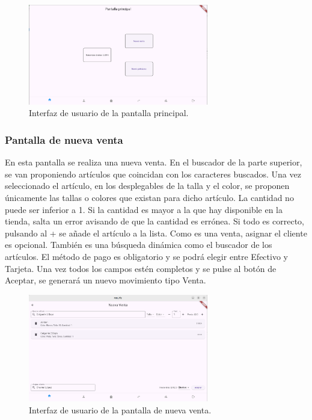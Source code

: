 \begin{figure}[H]
	\centering
	\includegraphics[width=0.7\textwidth]{imagenes/SegundaIteracion/pantallaPrincipal.png}
	\caption{Interfaz de usuario de la pantalla principal.}
	\label{fig:appPantallaPrincipal}
\end{figure}

\subsubsection{Pantalla de nueva venta}

En esta pantalla se realiza una nueva venta. En el buscador de la parte superior, se van proponiendo artículos que coincidan con los caracteres buscados. Una vez seleccionado el artículo, en los desplegables de la talla y el color, se proponen únicamente las tallas o colores que existan para dicho artículo. La cantidad no puede ser inferior a 1. Si la cantidad es mayor a la que hay disponible en la tienda, salta un error avisando de que la cantidad es errónea. Si todo es correcto, pulsando al + se añade el artículo a la lista. Como es una venta, asignar el cliente es opcional. También es una búsqueda dinámica como el buscador de los artículos. El método de pago es obligatorio y se podrá elegir entre Efectivo y Tarjeta. Una vez todos los campos estén completos y se pulse al botón de Aceptar, se generará un nuevo movimiento tipo Venta.

\begin{figure}[H]
	\centering
	\includegraphics[width=0.7\textwidth]{imagenes/SegundaIteracion/nuevaVenta.png}
	\caption{Interfaz de usuario de la pantalla de nueva venta.}
	\label{fig:appPantallaNuevaVenta}
\end{figure}

